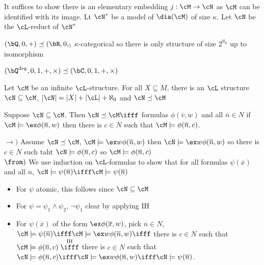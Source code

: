 \begin{pf}
    It suffices to show there is an elementary embedding $j: \cM \to \cN$ as $\cM$ can be identified with its image. Lt $\cN^*$ be a model of $\dia(\cM)$ of size $\kappa$. Let $\cN$ be the $\cL$-reduct of $\cN^*$
\end{pf}

\begin{example}
    $(\bQ, 0 , +) \preceq (\bR, 0, _ )$ $\kappa$-categorical so there is only structure of size $2^{\aleph_0}$ up to isomorphism 
\end{example}

\begin{example}
    $(\bQ^{\text{deg}}, 0, 1, + , \times) \preceq (\bC, 0, 1, +, \times)$ 
\end{example}

\begin{theorem}
    Let $\cM$ be an infinite $\cL$-structure. For all $X \subseteq M$, there is an $\cL$ structure $\cN \subseteq \cM$, $|\cN| = |X| +|\cL| + \aleph_0$ and $\cN \preceq \cM$
\end{theorem}

\begin{proposition}
    Suppose $\cN \subseteq \cM$. Then $\cN \preceq \cM \ifff$ formulas $\phi(\overline{v},w)$ and all $\overline{n} \in N$ if $\cM \models \ex \phi(\overline{n}, w)$ then there is $c \in N$ such that $\cM \models \phi(\overline{n},c)$.
\end{proposition}

\begin{pf}
    $\to )$ Assume $\cN \preceq \cM$, $\cM \models \ex w \phi(\overline{n},w)$ then $\cN \models \ex w \phi(\overline{n}, w)$ so there is $c \in N$ such taht $\cN \models \phi(\overline{n},c)$ so $\cM \models \phi(\overline{n},c)$ \\
    $\from )$ We use induction on $\cL$-formulas to show that for all formulas $\psi(\overline{x})$ and all $\overline{n}$, $\cN \models \psi(\overline{n}) \ifff \cM \models \psi(\overline{n})$ 
    \begin{itemize}
        \item For $\psi$ atomic, this follows since $\cN \subseteq \cM$ 
        \item For $\psi =\psi_1 \wedge \psi_2$, $\neg \psi_1$ clear by applying IH 
        \item For $\psi(\overline{x})$ of the form $\ex \phi(\overline{x},w)$, pick $\overline{n} \in N$, $\cM \models \psi(\overline{n}) \ifff \cM \models \ex w \phi(\overline{n},w) \ifff$ there is $c \in N$ such that $\cM \models \phi(\overline{n},c) \stackrel{\text{IH}}{\ifff}$ there is $c \in N$ such that $\cN \models \phi(\overline{n},c) \ifff \cN \models \ex w \phi(\overline{n},w) \ifff \cN \models \psi(\overline{n})$.  
    \end{itemize} 
\end{pf}

